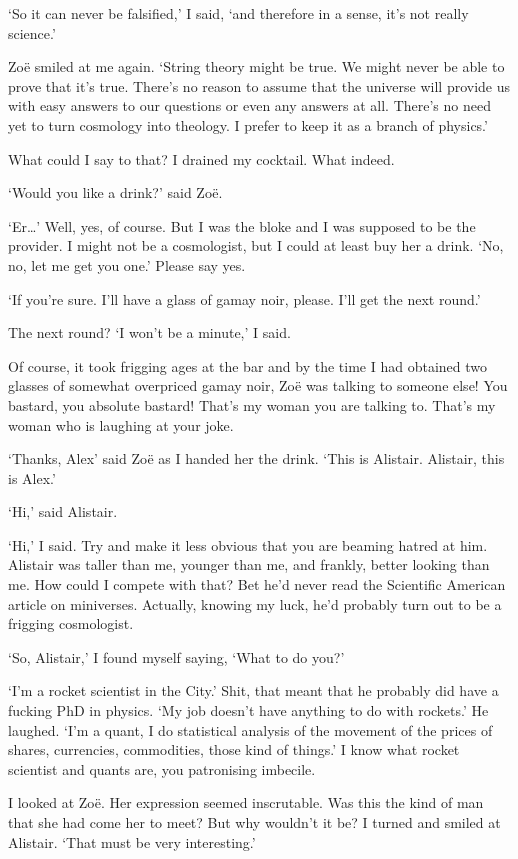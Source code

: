 `So it can never be falsified,' I said, `and therefore in a sense,
it's not really science.'

Zo{\"e} smiled at me again. `String theory might be true. We might
never be able to prove that it's true. There's no reason to assume
that the universe will provide us with easy answers to our questions
or even any answers at all. There's no need yet to turn cosmology
into theology. I prefer to keep it as a branch of physics.'

What could I say to that? I drained my cocktail. What indeed.

`Would you like a drink?' said Zo{\"e}.

`Er\dots' Well, yes, of course. But I was the bloke and I was
supposed to be the provider. I might not be a cosmologist, but I
could at least buy her a drink. `No, no, let me get you one.' Please
say yes.

`If you're sure. I'll have a glass of gamay noir, please. I'll get
the next round.'

The next round? `I won't be a minute,' I said.

Of course, it took frigging ages at the bar and by the time I had
obtained two glasses of somewhat overpriced gamay noir, Zo{\"e} was
talking to someone else! You bastard, you absolute bastard! That's
{\twelveit my\/} woman you are talking to. That's {\twelveit my\/}
woman who is laughing at your joke.

`Thanks, Alex' said Zo{\"e} as I handed her the drink. `This is
Alistair. Alistair, this is Alex.'

`Hi,' said Alistair.

`Hi,' I said. Try and make it less obvious that you are beaming
hatred at him. Alistair was taller than me, younger than me, and
frankly, better looking than me. How could I compete with that? Bet
he'd never read the {\twelvesl Scientific American\/} article on
miniverses. Actually, knowing my luck, he'd probably turn out to be
a frigging cosmologist.

`So, Alistair,' I found myself saying, `What to do you?'

`I'm a rocket scientist in the City.' Shit, that meant that he
probably did have a fucking PhD in physics. `My job doesn't have
anything to do with rockets.' He laughed. `I'm a quant, I do
statistical analysis of the movement of the prices of shares,
currencies, commodities, those kind of things.' I know what rocket
scientist and quants are, you patronising imbecile.

I looked at Zo{\"e}. Her expression seemed inscrutable. Was this the
kind of man that she had come her to meet? But why wouldn't it be? I
turned and smiled at Alistair. `That must be very interesting.'

